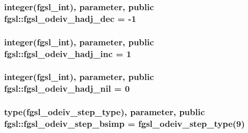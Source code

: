 \subsubsection[{fgsl\+\_\+odeiv\+\_\+hadj\+\_\+dec}]{\setlength{\rightskip}{0pt plus 5cm}integer({\bf fgsl\+\_\+int}), parameter, public fgsl\+::fgsl\+\_\+odeiv\+\_\+hadj\+\_\+dec = -\/1}\label{namespacefgsl_a2325b2b4a96fc162d6be916e21d71bb0}
\hypertarget{namespacefgsl_a6af547b616e922df4bf6658c0199307d}{}
\subsubsection[{fgsl\+\_\+odeiv\+\_\+hadj\+\_\+inc}]{\setlength{\rightskip}{0pt plus 5cm}integer({\bf fgsl\+\_\+int}), parameter, public fgsl\+::fgsl\+\_\+odeiv\+\_\+hadj\+\_\+inc = 1}\label{namespacefgsl_a6af547b616e922df4bf6658c0199307d}
\hypertarget{namespacefgsl_ac1c1bce27a4a8cb6ac049b401b496372}{}
\subsubsection[{fgsl\+\_\+odeiv\+\_\+hadj\+\_\+nil}]{\setlength{\rightskip}{0pt plus 5cm}integer({\bf fgsl\+\_\+int}), parameter, public fgsl\+::fgsl\+\_\+odeiv\+\_\+hadj\+\_\+nil = 0}\label{namespacefgsl_ac1c1bce27a4a8cb6ac049b401b496372}
\hypertarget{namespacefgsl_a64196b17cea8ee47b1386de3b5c3186e}{}
\subsubsection[{fgsl\+\_\+odeiv\+\_\+step\+\_\+bsimp}]{\setlength{\rightskip}{0pt plus 5cm}type({\bf fgsl\+\_\+odeiv\+\_\+step\+\_\+type}), parameter, public fgsl\+::fgsl\+\_\+odeiv\+\_\+step\+\_\+bsimp = {\bf fgsl\+\_\+odeiv\+\_\+step\+\_\+type}(9)}\label{namespacefgsl_a64196b17cea8ee47b1386de3b5c3186e}
\hypertarget{namespacefgsl_adc37c503cd35373720d2238db569e06a}{}
